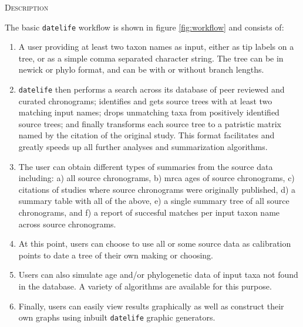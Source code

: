 \documentclass[]{article}
\providecommand{\tightlist}{%
  \setlength{\itemsep}{0pt}\setlength{\parskip}{0pt}}
\begin{document}
\begin{center}
\textsc{Description}
\end{center}

The basic \texttt{datelife} workflow is shown in figure \ref{fig:workflow} and consists of:

\begin{enumerate}
\def\labelenumi{\arabic{enumi})}
\tightlist
\item
  A user providing at least two taxon names as input, either as tip labels on a tree, or as a simple comma separated character string. The tree can be in newick or phylo format, and can be with or without branch lengths.
\item
  \texttt{datelife} then performs a search across its database of peer reviewed and curated chronograms; identifies and gets source trees with at least two matching input names; drops unmatching taxa from positively identified source trees; and finally transforms each source tree to a patristic matrix named by the citation of the original study. This format facilitates and greatly speeds up all further analyses and summarization algorithms.
\item
  The user can obtain different types of summaries from the source data including: a) all source chronograms, b) mrca ages of source chronograms, c) citations of studies where source chronograms were originally published, d) a summary table with all of the above, e) a single summary tree of all source chronograms, and f) a report of succesful matches per input taxon name across source chronograms.
\item
  At this point, users can choose to use all or some source data as calibration points to date a tree of their own making or choosing. 
\item
  Users can also simulate age and/or phylogenetic data of input taxa not found in the database. A variety of algorithms are available for this purpose.
\item
  Finally, users can easily view results graphically as well as construct their own graphs using inbuilt \texttt{datelife} graphic generators.
\end{enumerate}
\end{document}
